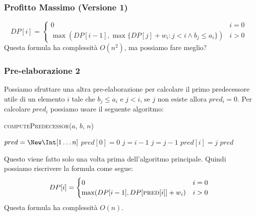         \subsubsection{Profitto Massimo (Versione 1)}
            $$
                DP[i]=
                \begin{cases}
                    0 & i=0\\
                    \max(DP[i-1], \max\{DP[j]+w_i:j<i\land b_j\leq a_i\}) & i>0
                \end{cases}
            $$
            Questa formula ha complessità $O(n^2)$, ma possiamo fare meglio?
        \subsubsection{Pre-elaborazione 2}
            Possiamo sfruttare una altra pre-elaborazione per calcolare il primo predecessore utile di un elemento $i$ tale che $b_j\leq a_i$ e $j<i$, se $j$ non esiste allora $pred_i=0$.\newline
            Per calcolare $pred_i$ possiamo usare il seguente algoritmo:
            \begin{algorithm}[H]
                \caption{\Int [] \textsc{computePredecessor}(\Int[] $a$, \Int[] $b$, \Int $n$)}
                \begin{algorithmic}
                    \State \Int[] $pred = \New \Int[1\dots n]$
                    \State $pred[0]=0$
                        \State $j = i-1$
                            \State $j=j-1$
                        \EndWhile
                        \State $pred[i]=j$
                    \EndFor
                    \State \Return $pred$
                \end{algorithmic}
            \end{algorithm}
            Questo viene fatto solo una volta prima dell'algoritmo principale.\newline
            Quindi possiamo riscrivere la formula come segue:
            $$
                DP[i]=\begin{cases}
                    0 & i=0\\
                    \max(DP[i-1], DP[\textsc{pred}[i]]+w_i) & i>0
                \end{cases}
            $$
            Questa formula ha complessità $O(n)$.
